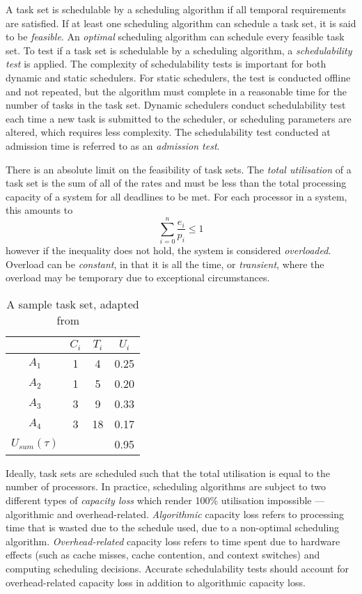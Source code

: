 A task set is schedulable by a scheduling algorithm if all temporal requirements are satisfied.
If at least one scheduling algorithm can schedule a task set, it is said to be \emph{feasible}.
An \emph{optimal} scheduling algorithm can schedule every feasible task set.
To test if a task set is schedulable by a scheduling algorithm, a \emph{schedulability test} is applied.
The complexity of schedulability tests is important for both dynamic and static schedulers. For
static schedulers, the test is conducted offline and not repeated, but the algorithm must complete
in a reasonable time for the number of tasks in the task set. Dynamic schedulers conduct
schedulability test each time a new task is submitted to the scheduler, or scheduling parameters are
altered, which requires less complexity. The schedulability test conducted at admission time is
referred to as an \emph{admission test}.

There is an absolute limit on the feasibility of task sets.
The \emph{total utilisation} of a task set is the sum of all of the rates and must be less than the
total processing capacity of a system for all deadlines to be met.
For each processor in a system, this amounts to
\begin{equation*}
	\sum\limits_{i=0}^n \dfrac{e_{i}}{p_{i}} \leq 1
\end{equation*}
however if the inequality does not hold, the system is considered \emph{overloaded}. Overload
can be \emph{constant}, in that it is all the time, or \emph{transient}, where the overload may be
temporary due to exceptional circumstances.

\begin{table}
    \centering
    \begin{tabular}{cccc} \toprule
        & \emph{$C_{i}$} & $T_{i}$ & $U_{i} $ \\ \midrule
			$ A_{1}$ & 1 & 4 & 0.25 \\
			$ A_{2}$ & 1 & 5 & 0.20 \\
			$ A_{3}$ & 3 & 9 & 0.33 \\
			$ A_{4}$ & 3 & 18 & 0.17  \\\midrule 
	$ U_{sum}(\tau)$ & &  & 0.95 \\ \bottomrule
	\end{tabular}
	\caption{A sample task set, adapted from ~\citep{Brandenburg:phd}}
	\label{tab:example_task_set}
\end{table}

Ideally, task sets are scheduled such that the total utilisation is equal to the number of
processors.  In practice, scheduling algorithms are subject to two different types of \emph{capacity
loss} which render 100\% utilisation impossible --- algorithmic and overhead-related.
\emph{Algorithmic} capacity loss refers to processing time that is wasted due to the schedule used,
due to a non-optimal scheduling algorithm.  \emph{Overhead-related} capacity loss refers to time
spent due to hardware effects (such as cache misses, cache contention, and context switches) and
computing scheduling decisions.  Accurate schedulability tests should account for overhead-related
capacity loss in addition to algorithmic capacity loss.

